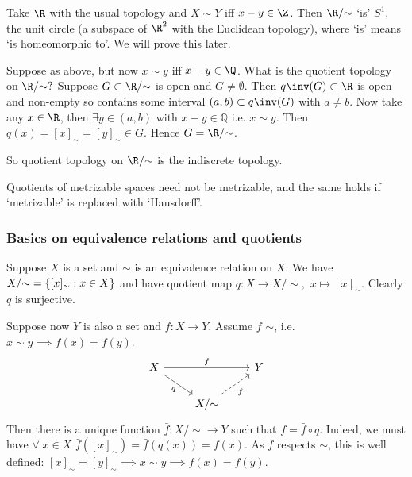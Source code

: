 \begin{example}
    Take $\R$ with the usual topology and $X\sim Y$ iff $x-y\in \Z$.
    Then $\R/ {\sim}$ `is' $S^1$, the unit circle (a subspace of $\R^2$ with the Euclidean topology), where `is' means `is homeomorphic to'.
    We will prove this later.
\end{example}

\begin{example}
    Suppose as above, but now $x\sim y$ iff $x-y\in \Q$. What is the quotient topology on $\R/ {\sim}?$
    Suppose $G\subset \R/ {\sim}$ is open and $G\neq \emptyset$.
    Then $q\inv (G)\subset\R$ is open and non-empty so contains some interval $(a,b)\subset q\inv (G)$ with $a\neq b$.
    Now take any $x\in \R$, then $\exists y\in (a,b)$ with $x-y\in \mathbb{Q}$ i.e. $x\sim y$.
    Then $q(x) = [x]_\sim = [y]_\sim \in G$. Hence $G = \R/ {\sim}$.

    So quotient topology on $\R/ {\sim}$ is the indiscrete topology.
\end{example}

\begin{example}
    Quotients of metrizable spaces need not be metrizable, and the same holds if `metrizable' is replaced with `Hausdorff'.
\end{example}

\subsubsection{Basics on equivalence relations and quotients}

Suppose $X$ is a set and $\sim$ is an equivalence relation on $X$. We have $X/ {\sim} = \{[x]_\sim : x\in X\}$ and have quotient map $q:X \to X/ {\sim},$ $x \mapsto [x]_\sim$. Clearly $q$ is surjective.

Suppose now $Y$ is also a set and $f:X\to Y$. Assume $f$  $\sim$, i.e. $x\sim y \implies f(x) = f(y)$.
\[\begin{tikzcd}
	X && Y \\
	& {X/ {\sim}}
	\arrow["q"', from=1-1, to=2-2]
	\arrow["{\bar{f}}"', dashed, from=2-2, to=1-3]
	\arrow["f", from=1-1, to=1-3]
\end{tikzcd}\]
Then there is a unique function $\bar{f}: X/ {\sim} \to Y$ such that $f = \bar{f}\circ q$.
Indeed, we must have $\forall \; x \in X$ $\bar{f}([x]_\sim) = \bar{f}(q(x)) = f(x)$.
As $f$ respects $\sim$, this is well defined: $[x]_\sim = [y]_\sim \implies x \sim y \implies f(x) = f(y)$.


